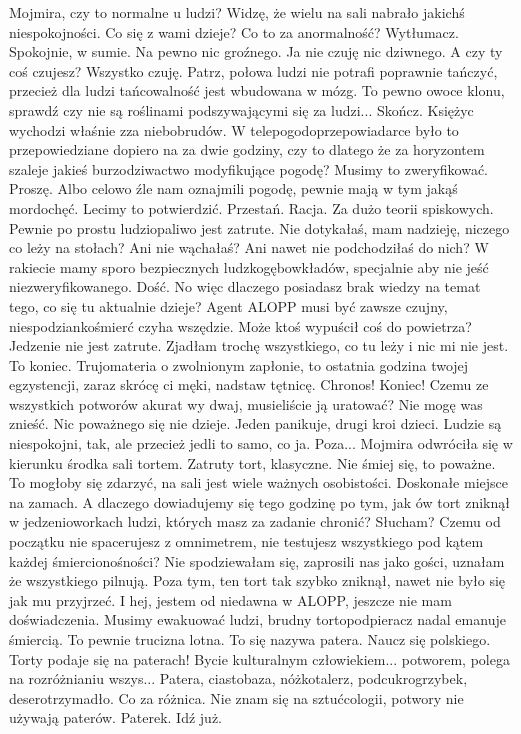 \begin{dialogue}
\ds{} Mojmira, czy to normalne u ludzi? Widzę, że wielu na sali nabrało jakichś niespokojności. Co się z wami dzieje? Co to za anormalność? Wytłumacz.
\ds{} Spokojnie, w sumie. Na pewno nic groźnego. Ja nie czuję nic dziwnego. A czy ty coś czujesz?
\ds{} Wszystko czuję. Patrz, połowa ludzi nie potrafi poprawnie tańczyć, przecież dla ludzi tańcowalność jest wbudowana w mózg.
To pewno owoce klonu, sprawdź czy nie są roślinami podszywającymi się za ludzi...
\ds{} Skończ.
\ds{} Księżyc wychodzi właśnie zza niebobrudów. 
W telepogodoprzepowiadarce było to przepowiedziane dopiero na za dwie godziny, czy to dlatego że 
za horyzontem szaleje jakieś burzodziwactwo modyfikujące pogodę? Musimy to zweryfikować.
\ds{} Proszę.
\ds{} Albo celowo źle nam oznajmili pogodę, pewnie mają w tym jakąś mordochęć. Lecimy to potwierdzić.
\ds{} Przestań.
\ds{} Racja. Za dużo teorii spiskowych. Pewnie po prostu ludziopaliwo jest zatrute. 
Nie dotykałaś, mam nadzieję, niczego co leży na stołach? Ani nie wąchałaś? Ani nawet nie podchodziłaś do nich?
W rakiecie mamy sporo bezpiecznych ludzkogębowkładów, specjalnie aby nie jeść niezweryfikowanego.
\ds{} Dość. 
\ds{} No więc dlaczego posiadasz brak wiedzy na temat tego, co się tu aktualnie dzieje? 
Agent ALOPP musi być zawsze czujny, niespodziankośmierć czyha wszędzie. Może ktoś wypuścił coś do powietrza?
\ds{} Jedzenie nie jest zatrute. Zjadłam trochę wszystkiego, co tu leży i nic mi nie jest.
\ds{} To koniec. Trujomateria o zwolnionym zapłonie, to ostatnia godzina twojej egzystencji, zaraz skrócę ci męki, nadstaw tętnicę.
\ds{} Chronos! Koniec! Czemu ze wszystkich potworów akurat wy dwaj, musieliście ją uratować? Nie mogę was znieść. Nic poważnego się nie dzieje. 
Jeden panikuje, drugi kroi dzieci.
Ludzie są niespokojni, tak, ale przecież jedli to samo, co ja. Poza...
\dm{} Mojmira odwróciła się w kierunku środka sali \dm{} tortem.
\ds{} Zatruty tort, klasyczne.
\ds{} Nie śmiej się, to poważne. To mogłoby się zdarzyć, na sali jest wiele ważnych osobistości. Doskonałe miejsce na zamach.
\ds{} A dlaczego dowiadujemy się tego godzinę po tym, jak ów tort zniknął w jedzenioworkach ludzi, których masz za zadanie chronić? Słucham? 
Czemu od początku nie spacerujesz z omnimetrem, nie testujesz wszystkiego pod kątem każdej śmiercionośności?
\ds{} Nie spodziewałam się, zaprosili nas jako gości, uznałam że wszystkiego pilnują. Poza tym, ten tort tak szybko zniknął, nawet nie było się jak mu przyjrzeć. 
I hej, jestem od niedawna w ALOPP, jeszcze nie mam doświadczenia.
\ds{} Musimy ewakuować ludzi, brudny tortopodpieracz nadal emanuje śmiercią. To pewnie trucizna lotna.
\ds{} To się nazywa patera. Naucz się polskiego. Torty podaje się na paterach! Bycie kulturalnym człowiekiem... potworem, polega na rozróżnianiu wszys...
\ds{} Patera, ciastobaza, nóżkotalerz, podcukrogrzybek, deserotrzymadło. Co za różnica. Nie znam się na sztućcologii, potwory nie używają paterów.
\ds{} Paterek.
\ds{} Idź już.
\end{dialogue}

